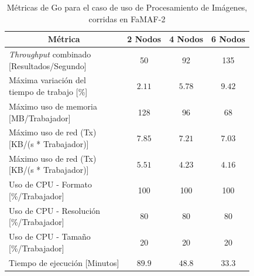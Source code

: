 \documentclass[11pt]{article}
\providecommand{\row}[1]{\parbox{150pt}{\setlength{\baselineskip}{0.2\baselineskip}\strut#1\strut}}
\newcommand{\ipcap}[2]{\caption{Métricas de #1 para el caso de uso de Procesamiento de Imágenes, corridas en #2}}
\newcommand{\english}[1]{\textit{#1}}
\begin{document}
\begin{table}[H]
\centering
\begin{tabular}{|l|c|c|c|}
\hline
\multicolumn{1}{|c|}{Métrica} & 2 Nodos & 4 Nodos & 6 Nodos \\ \hline
\row{\english{Throughput} combinado\\{[Resultados/Segundo]}} & 50 & 92 & 135 \\ \hline
\row{Máxima variación del \\ tiempo de trabajo {[}\%{]}} & $2.11$ & $5.78$ & $9.42$ \\ \hline
\row{Máximo uso de memoria \\ {[MB/Trabajador]}} & 128 & 96 & 68 \\ \hline
\row{Máximo uso de red (Tx) \\ {[KB/(s * Trabajador)]}} & $7.85$ & $7.21$ & $7.03$ \\ \hline
\row{Máximo uso de red (Tx) \\ {[KB/(s * Trabajador)]}} & $5.51$ & $4.23$ & $4.16$ \\ \hline
\row{Uso de CPU - Formato\\{[\%/Trabajador]}} & 100 & 100 & 100 \\ \hline
\row{Uso de CPU - Resolución\\{[\%/Trabajador]}} & 80 & 80 & 80 \\ \hline
\row{Uso de CPU - Tamaño\\{[\%/Trabajador]}} & 20 & 20 & 20 \\ \hline
Tiempo de ejecución [Minutos] & $89.9$ & $48.8$ & $33.3$ \\ \hline
\end{tabular}
\ipcap{Go}{FaMAF-2}
\end{table}
\end{document}
